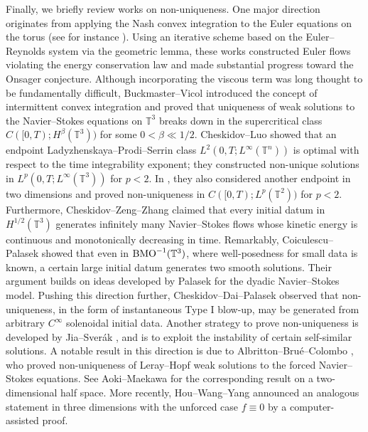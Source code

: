 \documentclass[a4paper,12pt,reqno]{amsart}
\theoremstyle{plain}
\theoremstyle{definition}
\begin{document}
Finally, we briefly review works on non-uniqueness. One major direction originates from applying the Nash convex integration
to the Euler equations on the torus (see for instance \cites{DeLellis-Szekelyhidi-09,Isett-18,Daneri-Szekelyhidi-2017-ARMA,Lellis-Szekelyhidi-2013-Invent,Buckmaster-Lellis-Isett-Szekelyhidi-2015-AnnMath}). Using an iterative scheme based on the Euler--Reynolds system via the geometric lemma,
these works constructed Euler flows violating the energy conservation law and made substantial progress toward the Onsager conjecture.
Although incorporating the viscous term was long thought to be fundamentally difficult, Buckmaster--Vicol \cite{Buc-Vic-19}
introduced the concept of intermittent convex integration and proved that uniqueness of weak solutions to the
Navier--Stokes equations on $\mathbb{T}^3$ breaks down in the supercritical class
$C([0,T);H^\beta(\mathbb{T}^3))$ for some $0<\beta\ll 1/2$.
Cheskidov--Luo \cite{Che-Luo-21} showed that an endpoint Ladyzhenskaya--Prodi--Serrin class
$L^2(0,T;L^\infty(\mathbb{T}^n))$
is optimal with respect to the time integrability exponent; they constructed non-unique solutions in
$L^p(0,T;L^\infty(\mathbb{T}^3))$ for $p<2$.
In \cite{Che-Luo-22-AnnPDE}, they also considered another endpoint in two dimensions and proved non-uniqueness in
$C([0,T);L^p(\mathbb{T}^2))$ for $p<2$.
Furthermore, Cheskidov--Zeng--Zhang \cite{arXiv:2503.05692} claimed that every initial datum in
$H^{1/2}(\mathbb{T}^3)$ generates infinitely many Navier--Stokes flows whose kinetic energy is continuous
and monotonically decreasing in time. 
Remarkably, Coiculescu--Palasek \cite{Coi-Pal-25} showed that even in
${\rm BMO}^{-1}(\mathbb{T}^3)$, where well-posedness for small data is known, a certain large initial datum generates two smooth solutions.
Their argument builds on ideas developed by Palasek \cite{Pal-25-IMRN} for the dyadic Navier--Stokes model.
Pushing this direction further, Cheskidov--Dai--Palasek \cite{arXiv:2511.09556} observed that non-uniqueness, in the form of
instantaneous Type I blow-up, may be generated from arbitrary $C^{\infty}$ solenoidal initial data.
Another strategy to prove non-uniqueness is developed by Jia--Sver\'ak \cites{Jia-Sve-Invent,Jia-Sve-JFA}, and is to exploit the instability of certain self-similar solutions.
A notable result in this direction is due to Albritton--Bru\'e--Colombo \cite{Alb-Bru-Col-AnnMath}, who proved non-uniqueness of Leray--Hopf weak solutions
to the forced Navier--Stokes equations.
See Aoki--Maekawa \cite{Aok-Mae} for the corresponding result on a two-dimensional half space.
More recently, Hou--Wang--Yang \cite{2509.25116v1} announced an analogous statement in three dimensions with the unforced case $f\equiv 0$ by a computer-assisted proof.
\end{document}
